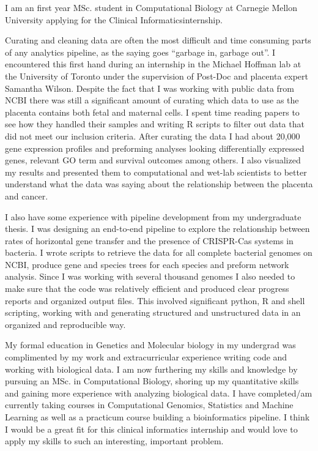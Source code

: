 \documentclass[11pt, a4paper]{./Awesome-CV/awesome-cv}
\begin{document}
\vspace{-0.1in}
\vspace*{\fill}
\makelettertitle %

\begin{cvletter}
\hspace{8mm} I am an first year MSc. student in Computational Biology at Carnegie Mellon University applying for the Clinical Informaticsinternship.
\par \hspace{8mm}
Curating and cleaning data are often the most difficult and time consuming parts of any analytics pipeline, as the saying goes ``garbage in, garbage out''.
I encountered this first hand during an internship in the Michael Hoffman lab at the University of Toronto under the supervision of Post-Doc and placenta expert Samantha Wilson.
Despite the fact that I was working with public data from NCBI there was still a significant amount of curating which data to use as the placenta contains both fetal and maternal cells.
I spent time reading papers to see how they handled their samples and writing R scripts to filter out data that did not meet our inclusion criteria.
After curating the data I had about 20,000 gene expression profiles and preforming analyses looking differentially expressed genes, relevant GO term and survival outcomes among others.
I also visualized my results and presented them to computational and wet-lab scientists to better understand what the data was saying about the relationship between the placenta and cancer.
\par \hspace{8mm}
I also have some experience with pipeline development from my undergraduate thesis.
I was designing an end-to-end pipeline to explore the relationship between rates of horizontal gene transfer and the presence of CRISPR-Cas systems in bacteria.
I wrote scripts to retrieve the data for all complete bacterial genomes on NCBI, produce gene and species trees for each species and preform network analysis.
Since I was working with several thousand genomes I also needed to make sure that the code was relatively efficient and produced clear progress reports and organized output files.
This involved significant python, R and shell scripting, working with and generating structured and unstructured data in an organized and reproducible way.
\par \hspace{8mm}
My formal education in Genetics and Molecular biology in my undergrad was complimented by my work and extracurricular experience writing code and working with biological data.
I am now furthering my skills and knowledge by pursuing an MSc. in Computational Biology, shoring up my quantitative skills and gaining more experience with analyzing biological data.
I have completed/am currently taking courses in Computational Genomics, Statistics and Machine Learning as well as a practicum course building a bioinformatics pipeline.
I think I would be a great fit for this clinical informatics internship and would love to apply my skills to such an interesting, important problem.


\end{cvletter}
\end{document}
